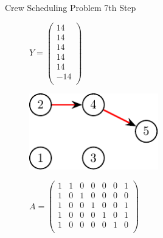 \documentclass{beamer}
\begin{document}
\begin{frame}{Crew Scheduling Problem}
    7th Step
    \begin{figure}[!htb]
        \begin{minipage}{0.48\textwidth}
            \centering
            $Y = \begin{pmatrix}14\\ 14\\ 14\\ 14\\ 14\\ -14\\ \end{pmatrix}$
                \begin{center}
                {
                \centering
                \includegraphics[width=0.5\textwidth]{graph2.pdf}
                }
                \end{center}
            \end{minipage}
        \begin{minipage}{0.48\textwidth}
            $A = \begin{pmatrix}
                1 & 1 & 0 & 0 & 0 & 0 & 1\\
                1 & 0 & 1 & 0 & 0 & 0 & 0\\
                1 & 0 & 0 & 1 & 0 & 0 & 1\\
                1 & 0 & 0 & 0 & 1 & 0 & 1\\
                1 & 0 & 0 & 0 & 0 & 1 & 0\\
            \end{pmatrix}$
        \end{minipage}
    \end{figure}
\end{frame}
\end{document}
